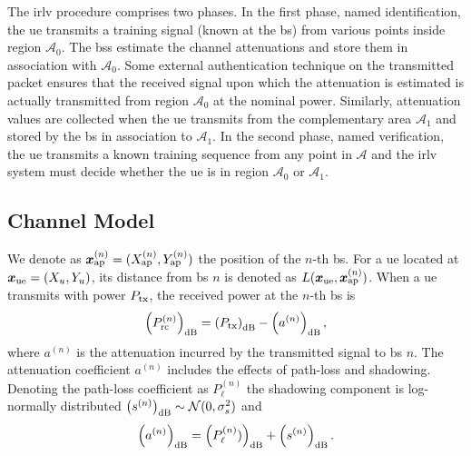 \documentclass[conference,draftcls,onecolumn]{IEEEtran}
\begin{document}
The \ac{irlv} procedure comprises two phases. In the first phase, named identification, the \ac{ue} transmits a training signal (known at the \acs{bs}) from various points inside region $\mathcal{A}_0$.  The \acp{bs} estimate the channel attenuations and store them in association with $\mathcal{A}_0$. Some external authentication technique on the transmitted packet  ensures that the received signal upon which the attenuation is estimated is actually transmitted from region $\mathcal{A}_0$ at the nominal power. Similarly, attenuation values are collected when the \ac{ue} transmits  from the complementary area $\mathcal{A}_1$ and  stored by the \ac{bs} in association to $\mathcal{A}_1$. In the second  phase, named verification, the \ac{ue} transmits a known training sequence from any point in $\mathcal{A}$ and the \ac{irlv} system must decide whether the \ac{ue} is in region $\mathcal{A}_0$ or $\mathcal{A}_1$.


\subsection{Channel Model}

We denote as $\bm{x}_{\rm ap}^{(n)} =(X_{\rm ap}^{(n)},Y_{\rm ap}^{(n)})$ the position of the $n$-th \ac{bs}. For a \ac{ue} located at $\bm{x}_{\rm ue}=(X_u,Y_u)$, its distance from \ac{bs} $n$ is denoted as $L(\bm{x}_{\rm ue},\bm{x}_{\rm ap}^{(n)})$. When a \ac{ue} transmits with power $P_{\rm tx}$, the received power at the $n$-th \ac{bs} is
\begin{equation}\label{eq: rec pow}
    \left(P_{\rm rc}^{(n)}\right)_{\rm dB}= \left(P_{\rm tx}\right)_{\rm dB} - \left(a^{(n)}\right)_{\rm dB},
\end{equation}
where $a^{(n)}$ is the attenuation incurred by the transmitted signal to \ac{bs} $n$. The attenuation coefficient $a^{(n)}$ includes the effects of path-loss and shadowing. Denoting the path-loss coefficient as $P_{\ell}^{(n)}$  the shadowing component is log-normally distributed $\left(s^{(n)}\right)_{\rm dB} \sim \mathcal{N}(0,\sigma_s^2)$ and
\begin{equation}
    \left(a^{(n)}\right)_{\rm dB} = \left(P_{\ell}^{(n)})\right)_{\rm dB} + \left(s^{(n)}\right)_{\rm dB}.
\end{equation}
\end{document}
